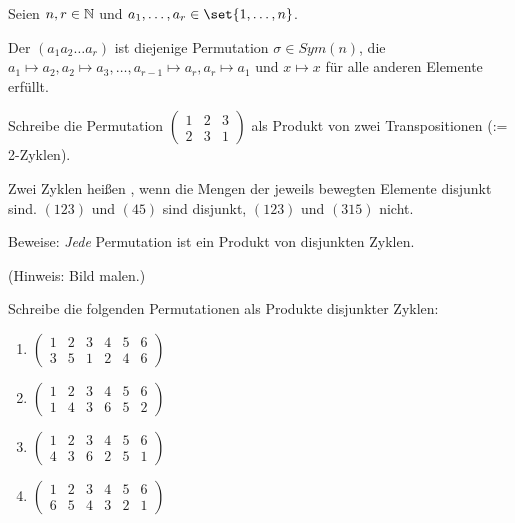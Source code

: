 \begin{sheet}
\begin{problem}[title={Zyklenzerlegung}]
Seien $n,r\in\mathbb{N}$ und $a_1,\ldots,a_r\in\set{1,\ldots,n}$.

Der  $(a_1 a_2 \ldots a_r)$ ist diejenige Permutation $\sigma\in Sym(n)$, die $a_1\mapsto a_2, a_2\mapsto a_3, \ldots, a_{r-1}\mapsto a_r, a_r\mapsto a_1$ und $x\mapsto x$ für alle anderen Elemente erfüllt.

\begin{subproblem}[difficulty={leicht}]
Schreibe die Permutation $\begin{pmatrix} 1 & 2 & 3 \\ 2 & 3 & 1 \end{pmatrix}$ als Produkt von zwei Transpositionen (:= 2-Zyklen).
\end{subproblem}

Zwei Zyklen heißen , wenn die Mengen der jeweils bewegten Elemente disjunkt sind. $(123)$ und $(45)$ sind disjunkt, $(123)$ und $(315)$ nicht.
\begin{subproblem}[difficulty={leicht bis mittel}]
Beweise: \emph{Jede} Permutation ist ein Produkt von disjunkten Zyklen.

(Hinweis: Bild malen.)
\end{subproblem}

\begin{subproblem}[difficulty={leicht}]
Schreibe die folgenden Permutationen als Produkte disjunkter Zyklen:
\begin{enumerate}[label=(\roman*)]
\item $\begin{pmatrix} 1 & 2 & 3 & 4 & 5 & 6 \\ 3 & 5 & 1 & 2 & 4 & 6\end{pmatrix}$
\item $\begin{pmatrix} 1 & 2 & 3 & 4 & 5 & 6 \\ 1 & 4 & 3 & 6 & 5 & 2\end{pmatrix}$
\item $\begin{pmatrix} 1 & 2 & 3 & 4 & 5 & 6 \\ 4 & 3 & 6 & 2 & 5 & 1\end{pmatrix}$
\item $\begin{pmatrix} 1 & 2 & 3 & 4 & 5 & 6 \\ 6 & 5 & 4 & 3 & 2 & 1\end{pmatrix}$
\end{enumerate}
\end{subproblem}


\end{problem}
\end{sheet}
